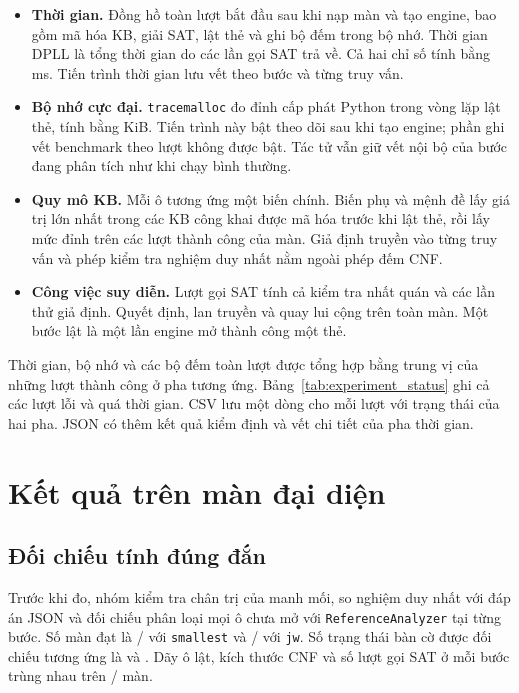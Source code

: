 \begin{itemize}
    \item \textbf{Thời gian.} Đồng hồ toàn lượt bắt đầu sau khi nạp màn và tạo engine, bao gồm mã hóa KB, giải SAT, lật thẻ và ghi bộ đếm trong bộ nhớ. Thời gian DPLL là tổng thời gian do các lần gọi SAT trả về. Cả hai chỉ số tính bằng ms. Tiến trình thời gian lưu vết theo bước và từng truy vấn.
    \item \textbf{Bộ nhớ cực đại.} \texttt{tracemalloc} đo đỉnh cấp phát Python trong vòng lặp lật thẻ, tính bằng KiB. Tiến trình này bật theo dõi sau khi tạo engine; phần ghi vết benchmark theo lượt không được bật. Tác tử vẫn giữ vết nội bộ của bước đang phân tích như khi chạy bình thường.
    \item \textbf{Quy mô KB.} Mỗi ô tương ứng một biến chính. Biến phụ và mệnh đề lấy giá trị lớn nhất trong các KB công khai được mã hóa trước khi lật thẻ, rồi lấy mức đỉnh trên các lượt thành công của màn. Giả định truyền vào từng truy vấn và phép kiểm tra nghiệm duy nhất nằm ngoài phép đếm CNF.
    \item \textbf{Công việc suy diễn.} Lượt gọi SAT tính cả kiểm tra nhất quán và các lần thử giả định. Quyết định, lan truyền và quay lui cộng trên toàn màn. Một bước lật là một lần engine mở thành công một thẻ.
\end{itemize}

Thời gian, bộ nhớ và các bộ đếm toàn lượt được tổng hợp bằng trung vị của những lượt thành công ở pha tương ứng. Bảng~\ref{tab:experiment_status} ghi cả các lượt lỗi và quá thời gian. CSV lưu một dòng cho mỗi lượt với trạng thái của hai pha. JSON có thêm kết quả kiểm định và vết chi tiết của pha thời gian.

\section{Kết quả trên \ExpMainStageCount{} màn đại diện}

\subsection{Đối chiếu tính đúng đắn}

Trước khi đo, nhóm kiểm tra chân trị của manh mối, so nghiệm duy nhất với đáp án JSON và đối chiếu phân loại mọi ô chưa mở với \texttt{ReferenceAnalyzer} tại từng bước. Số màn đạt là \ExpValidatedSmallest{}/\ExpStageCount{} với \texttt{smallest} và \ExpValidatedJW{}/\ExpStageCount{} với \texttt{jw}. Số trạng thái bàn cờ được đối chiếu tương ứng là \ExpSnapshotsSmallest{} và \ExpSnapshotsJW{}. Dãy ô lật, kích thước CNF và số lượt gọi SAT ở mỗi bước trùng nhau trên \ExpMatchedStages{}/\ExpStageCount{} màn.

